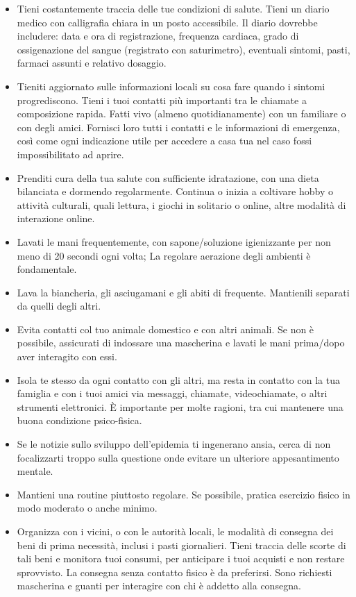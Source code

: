 \documentclass[onecolumn,journal]{IEEEtran}
\begin{document}
\begin{multicols}{2}
\begin{itemize}
  \item Tieni costantemente traccia delle tue condizioni di salute. Tieni un diario medico con calligrafia chiara in un posto accessibile. Il diario dovrebbe includere: data e ora di registrazione, frequenza cardiaca, grado di ossigenazione del sangue (registrato con saturimetro), eventuali sintomi, pasti, farmaci assunti e relativo dosaggio.
  \item Tieniti aggiornato sulle informazioni locali su cosa fare quando i sintomi progrediscono. Tieni i tuoi contatti più importanti tra le chiamate a composizione rapida. Fatti vivo (almeno quotidianamente) con un familiare o con degli amici. Fornisci loro tutti i contatti e le informazioni di emergenza, così come ogni indicazione utile per accedere a casa tua nel caso fossi impossibilitato ad aprire.
  \item Prenditi cura della tua salute con sufficiente idratazione, con una dieta bilanciata e dormendo regolarmente. Continua o inizia a coltivare hobby o attività culturali, quali lettura, i giochi in solitario o online, altre modalità di interazione online.
  \item Lavati le mani frequentemente, con sapone/soluzione igienizzante per non meno di 20 secondi ogni volta; La regolare aerazione degli ambienti è fondamentale.
  \item Lava la biancheria, gli asciugamani e gli abiti di frequente. Mantienili separati da quelli degli altri.
  \item Evita contatti col tuo animale domestico e con altri animali. Se non è possibile, assicurati di indossare una mascherina e lavati le mani prima/dopo aver interagito con essi.
  \item Isola te stesso da ogni contatto con gli altri, ma resta in contatto con la tua famiglia e con i tuoi amici via messaggi, chiamate, videochiamate, o altri strumenti elettronici. È importante per molte ragioni, tra cui mantenere una buona condizione psico-fisica.
  \item Se le notizie sullo sviluppo dell’epidemia ti ingenerano ansia, cerca di non focalizzarti troppo sulla questione onde evitare un ulteriore appesantimento mentale.
  \item Mantieni una routine piuttosto regolare. Se possibile, pratica esercizio fisico in modo moderato o anche minimo.
  \item Organizza con i vicini, o con le autorità locali, le modalità di consegna dei beni di prima necessità, inclusi i pasti giornalieri. Tieni traccia delle scorte di tali beni e monitora tuoi consumi, per anticipare i tuoi acquisti e non restare sprovvisto. La consegna senza contatto fisico è da preferirsi. Sono richiesti mascherina e guanti per interagire con chi è addetto alla consegna.

\end{itemize}
\end{multicols}
\end{document}
